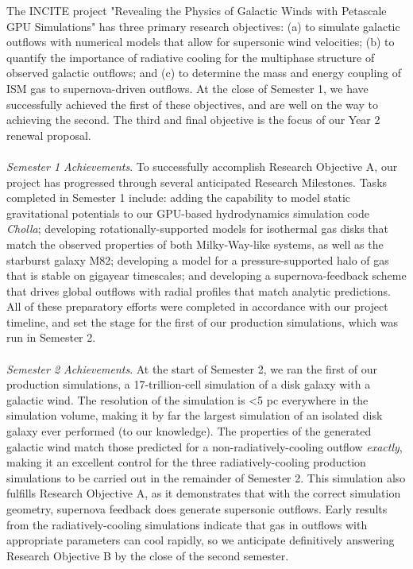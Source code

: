 \documentclass[11pt,letterpaper,english]{article}
\begin{document}
\vspace{.15in}
The INCITE project "Revealing the Physics of Galactic Winds with Petascale GPU Simulations" has three primary research objectives: (a) to simulate galactic outflows with numerical models that allow for supersonic wind velocities; (b) to quantify the importance of radiative cooling for the multiphase structure of observed galactic outflows; and (c) to determine the mass and energy coupling of ISM gas to supernova-driven outflows. At the close of Semester 1, we have successfully achieved the first of these objectives, and are well on the way to achieving the second. The third and final objective is the focus of our Year 2 renewal proposal.
~\\~\\
\textit{Semester 1 Achievements}. To successfully accomplish Research Objective A, our project has progressed through several anticipated Research Milestones. Tasks completed in Semester 1 include:  adding the capability to model static gravitational potentials to our GPU-based hydrodynamics simulation code \textit{Cholla}; developing rotationally-supported models for isothermal gas disks that match the observed properties of both Milky-Way-like systems, as well as the starburst galaxy M82; developing a model for a pressure-supported halo of gas that is stable on gigayear timescales; and developing a supernova-feedback scheme that drives global outflows with radial profiles that match analytic predictions. All of these preparatory efforts were completed in accordance with our project timeline, and set the stage for the first of our production simulations, which was run in Semester 2.
~\\~\\
\textit{Semester 2 Achievements}. At the start of Semester 2, we ran the first of our production simulations, a 17-trillion-cell simulation of a disk galaxy with a galactic wind. The resolution of the simulation is <5 pc everywhere in the simulation volume, making it by far the largest simulation of an isolated disk galaxy ever performed (to our knowledge). The properties of the generated galactic wind match those predicted for a non-radiatively-cooling outflow \textit{exactly}, making it an excellent control for the three radiatively-cooling production simulations to be carried out in the remainder of Semester 2. This simulation also fulfills Research Objective A, as it demonstrates that with the correct simulation geometry, supernova feedback does generate supersonic outflows. Early results from the radiatively-cooling simulations indicate that gas in outflows with appropriate parameters can cool rapidly, so we anticipate definitively answering Research Objective B by the close of the second semester.
\end{document}
